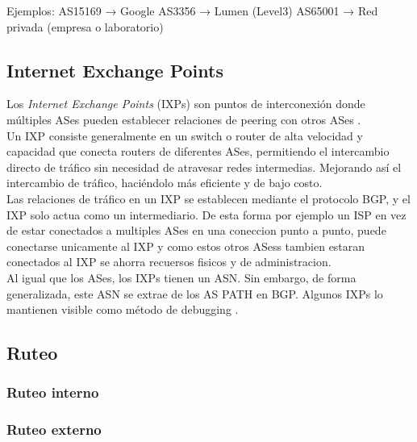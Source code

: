 Ejemplos:
AS15169 → Google
AS3356 → Lumen (Level3)
AS65001 → Red privada (empresa o laboratorio)






\subsection{Internet Exchange Points} \label{sec:anexo_internet_exchange_points}
Los \textit{Internet Exchange Points} (IXPs) son puntos de interconexión donde múltiples ASes pueden establecer relaciones de peering con otros ASes \cite{Computer-Networking}.\\

Un IXP consiste generalmente en un switch  o router de alta velocidad y capacidad que conecta routers de diferentes ASes, permitiendo el intercambio directo de tráfico sin necesidad de atravesar redes intermedias. Mejorando así el intercambio de tráfico, haciéndolo más eficiente y de bajo costo.\\

Las relaciones de tráfico en un IXP se establecen mediante el protocolo BGP, y el IXP solo actua como un intermediario. De esta forma por ejemplo un ISP en vez de estar conectados a multiples ASes  en una coneccion punto a punto, puede conectarse unicamente al IXP y como estos otros ASess tambien estaran conectados al IXP se ahorra recuersos fisicos y de administracion.\\

Al igual que los ASes, los IXPs tienen un ASN. Sin embargo, de forma generalizada, este ASN se extrae de los AS PATH en BGP. Algunos IXPs lo mantienen visible como método de debugging \cite{InferringASRelatioships2001}. 


\subsection{Ruteo} \label{sec:anexo_ruteo}
\subsubsection{Ruteo interno} \label{sec:anexo_ruteo_interno}
\subsubsection{Ruteo externo} \label{sec:anexo_ruteo_externo}





